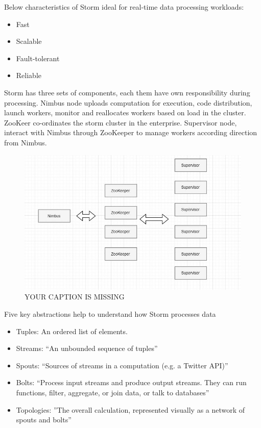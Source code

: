 Below characteristics of Storm ideal for real-time data processing workloads:

\begin{itemize}
\item Fast
\item Scalable
\item Fault-tolerant
\item Reliable
\end{itemize}
 
Storm has three sets of components, each them have own responsibility
during processing. Nimbus node uploads computation for execution, code
distribution, launch workers, monitor and reallocates workers based on
load in the cluster.  ZooKeer co-ordinates the storm cluster in the
enterprise. Supervisor node, interact with Nimbus through ZooKeeper to
manage workers according direction from Nimbus.

\begin{figure}[!ht]
\centering\includegraphics[width=\columnwidth]{images/Storm1.JPG}
  \caption{YOUR CAPTION IS MISSING}\label{f:storm}
\end{figure}

  
Five key abstractions help to understand how Storm processes data

\begin{itemize}
\item Tuples: An ordered list of elements.
\item Streams: ``An unbounded sequence of
  tuples''~\cite{hid-sp18-514-hwp}
\item Spouts: ``Sources of streams in a computation (e.g. a Twitter
  API)''~\cite{hid-sp18-514-hwp}
\item Bolts: ``Process input streams and produce output streams. They
  can run functions, filter, aggregate, or join data, or talk to
  databases''~\cite{hid-sp18-514-hwp}
\item Topologies: ''The overall calculation, represented visually as a
  network of spouts and bolts''~\cite{hid-sp18-514-hwp}
\end{itemize}


